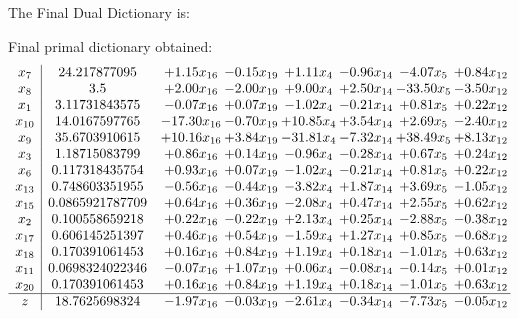 \documentclass[8pt]{article}
\begin{document}
The Final Dual Dictionary is: 

 Final primal dictionary obtained: 
\[\begin{array}{c| c c@{\hskip 2pt} c@{\hskip 2pt} c@{\hskip 2pt} c@{\hskip 2pt} c@{\hskip 2pt} c@{\hskip 2pt} }
 x_{7}   &  24.217877095 & +  1.15 x_{16} & -0.15 x_{19} & +  1.11 x_{4} & -0.96 x_{14} & -4.07 x_{5} & +  0.84 x_{12}\\
 x_{8}   &  3.5 & +  2.00 x_{16} & -2.00 x_{19} & +  9.00 x_{4} & +  2.50 x_{14} & -33.50 x_{5} & -3.50 x_{12}\\
 x_{1}   &  3.11731843575 & -0.07 x_{16} & +  0.07 x_{19} & -1.02 x_{4} & -0.21 x_{14} & +  0.81 x_{5} & +  0.22 x_{12}\\
 x_{10}   &  14.0167597765 & -17.30 x_{16} & -0.70 x_{19} & + 10.85 x_{4} & +  3.54 x_{14} & +  2.69 x_{5} & -2.40 x_{12}\\
 x_{9}   &  35.6703910615 & + 10.16 x_{16} & +  3.84 x_{19} & -31.81 x_{4} & -7.32 x_{14} & + 38.49 x_{5} & +  8.13 x_{12}\\
 x_{3}   &  1.18715083799 & +  0.86 x_{16} & +  0.14 x_{19} & -0.96 x_{4} & -0.28 x_{14} & +  0.67 x_{5} & +  0.24 x_{12}\\
 x_{6}   &  0.117318435754 & +  0.93 x_{16} & +  0.07 x_{19} & -1.02 x_{4} & -0.21 x_{14} & +  0.81 x_{5} & +  0.22 x_{12}\\
 x_{13}   &  0.748603351955 & -0.56 x_{16} & -0.44 x_{19} & -3.82 x_{4} & +  1.87 x_{14} & +  3.69 x_{5} & -1.05 x_{12}\\
 x_{15}   &  0.0865921787709 & +  0.64 x_{16} & +  0.36 x_{19} & -2.08 x_{4} & +  0.47 x_{14} & +  2.55 x_{5} & +  0.62 x_{12}\\
 x_{2}   &  0.100558659218 & +  0.22 x_{16} & -0.22 x_{19} & +  2.13 x_{4} & +  0.25 x_{14} & -2.88 x_{5} & -0.38 x_{12}\\
 x_{17}   &  0.606145251397 & +  0.46 x_{16} & +  0.54 x_{19} & -1.59 x_{4} & +  1.27 x_{14} & +  0.85 x_{5} & -0.68 x_{12}\\
 x_{18}   &  0.170391061453 & +  0.16 x_{16} & +  0.84 x_{19} & +  1.19 x_{4} & +  0.18 x_{14} & -1.01 x_{5} & +  0.63 x_{12}\\
 x_{11}   &  0.0698324022346 & -0.07 x_{16} & +  1.07 x_{19} & +  0.06 x_{4} & -0.08 x_{14} & -0.14 x_{5} & +  0.01 x_{12}\\
 x_{20}   &  0.170391061453 & +  0.16 x_{16} & +  0.84 x_{19} & +  1.19 x_{4} & +  0.18 x_{14} & -1.01 x_{5} & +  0.63 x_{12}\\
\hline
z    &  18.7625698324 & -1.97 x_{16} & -0.03 x_{19} & -2.61 x_{4} & -0.34 x_{14} & -7.73 x_{5} & -0.05 x_{12}\\
\end{array}\]
\end{document}

